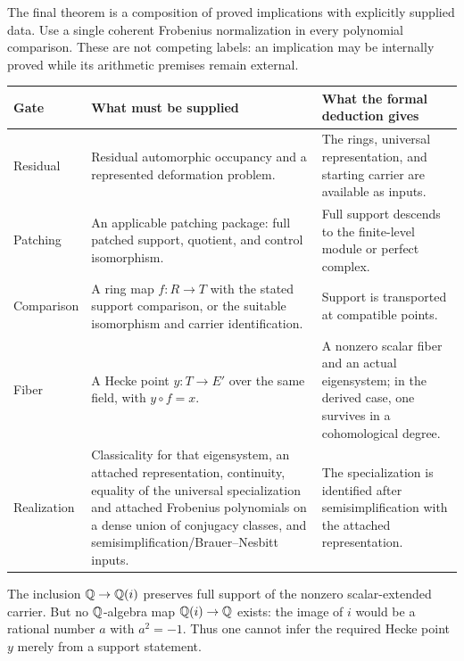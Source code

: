 
The final theorem is a composition of proved implications with explicitly supplied data. Use a single coherent Frobenius normalization in every polynomial comparison. These are not competing labels: an implication may be internally proved while its arithmetic premises remain external.

{\small
\begin{tabularx}{\linewidth}{@{}p{.13\linewidth}YY@{}}\toprule
\textbf{Gate} & \textbf{What must be supplied} & \textbf{What the formal deduction gives}\\\midrule
Residual & Residual automorphic occupancy and a represented deformation problem. & The rings, universal representation, and starting carrier are available as inputs.\\
Patching & An applicable patching package: full patched support, quotient, and control isomorphism. & Full support descends to the finite-level module or perfect complex.\\
Comparison & A ring map $f:R\to T$ with the stated support comparison, or the suitable isomorphism and carrier identification. & Support is transported at compatible points.\\
Fiber & A Hecke point $y:T\to E'$ over the same field, with $y\circ f=x$. & A nonzero scalar fiber and an actual eigensystem; in the derived case, one survives in a cohomological degree.\\
Realization & Classicality for that eigensystem, an attached representation, continuity, equality of the universal specialization and attached Frobenius polynomials on a dense union of conjugacy classes, and semisimplification/Brauer--Nesbitt inputs. & The specialization is identified after semisimplification with the attached representation.\\\bottomrule
\end{tabularx}}

The inclusion $\mathbb Q\to\mathbb Q(i)$ preserves full support of the nonzero scalar-extended carrier. But no $\mathbb Q$-algebra map $\mathbb Q(i)\to\mathbb Q$ exists: the image of $i$ would be a rational number $a$ with $a^2=-1$. Thus one cannot infer the required Hecke point $y$ merely from a support statement.


